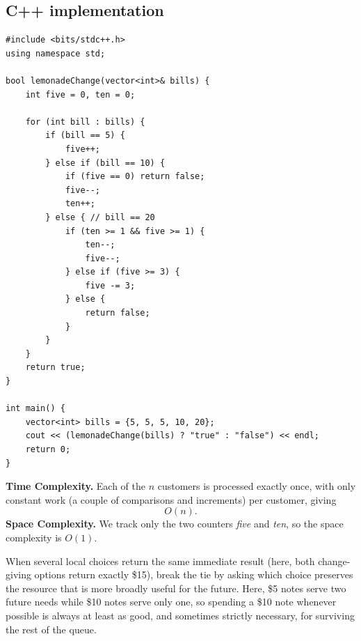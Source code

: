 \subsection*{C++ implementation}

\begin{lstlisting}
#include <bits/stdc++.h>
using namespace std;

bool lemonadeChange(vector<int>& bills) {
    int five = 0, ten = 0;

    for (int bill : bills) {
        if (bill == 5) {
            five++;
        } else if (bill == 10) {
            if (five == 0) return false;
            five--;
            ten++;
        } else { // bill == 20
            if (ten >= 1 && five >= 1) {
                ten--;
                five--;
            } else if (five >= 3) {
                five -= 3;
            } else {
                return false;
            }
        }
    }
    return true;
}

int main() {
    vector<int> bills = {5, 5, 5, 10, 20};
    cout << (lemonadeChange(bills) ? "true" : "false") << endl;
    return 0;
}
\end{lstlisting}

\begin{complexitybox}
\textbf{Time Complexity.} Each of the $n$ customers is processed exactly
once, with only constant work (a couple of comparisons and increments) per
customer, giving
\[
  O(n).
\]
\textbf{Space Complexity.} We track only the two counters \textit{five} and
\textit{ten}, so the space complexity is $O(1)$.
\end{complexitybox}

\begin{takeawaybox}
When several local choices return the same immediate result (here, both
change-giving options return exactly \$15), break the tie by asking which
choice preserves the resource that is more broadly useful for the future.
Here, \$5 notes serve two future needs while \$10 notes serve only one, so
spending a \$10 note whenever possible is always at least as good, and
sometimes strictly necessary, for surviving the rest of the queue.
\end{takeawaybox}
